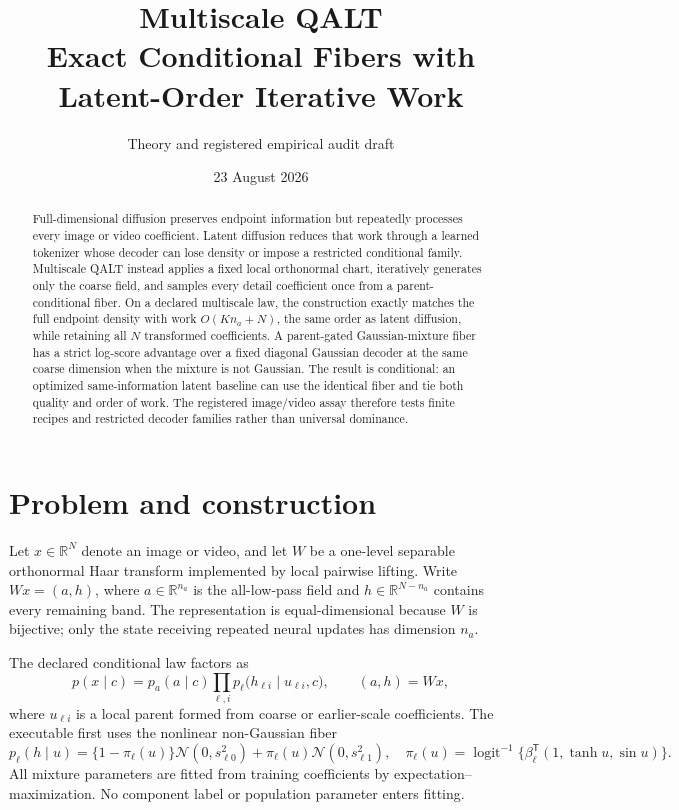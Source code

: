 \documentclass[11pt]{article}
\title{Multiscale QALT\\\large Exact Conditional Fibers with Latent-Order Iterative Work}
\author{Theory and registered empirical audit draft}
\date{23 August 2026}
\newcommand{\R}{\mathbb R}
\newcommand{\cN}{\mathcal N}
\begin{document}
\maketitle

\begin{abstract}
Full-dimensional diffusion preserves endpoint information but repeatedly processes every image or video coefficient.  Latent diffusion reduces that work through a learned tokenizer whose decoder can lose density or impose a restricted conditional family.  Multiscale QALT instead applies a fixed local orthonormal chart, iteratively generates only the coarse field, and samples every detail coefficient once from a parent-conditional fiber.  On a declared multiscale law, the construction exactly matches the full endpoint density with work $O(Kn_a+N)$, the same order as latent diffusion, while retaining all $N$ transformed coefficients.  A parent-gated Gaussian-mixture fiber has a strict log-score advantage over a fixed diagonal Gaussian decoder at the same coarse dimension when the mixture is not Gaussian.  The result is conditional: an optimized same-information latent baseline can use the identical fiber and tie both quality and order of work.  The registered image/video assay therefore tests finite recipes and restricted decoder families rather than universal dominance.
\end{abstract}

\section{Problem and construction}

Let $x\in\R^N$ denote an image or video, and let $W$ be a one-level separable orthonormal Haar transform implemented by local pairwise lifting.  Write $Wx=(a,h)$, where $a\in\R^{n_a}$ is the all-low-pass field and $h\in\R^{N-n_a}$ contains every remaining band.  The representation is equal-dimensional because $W$ is bijective; only the state receiving repeated neural updates has dimension $n_a$.

The declared conditional law factors as
\begin{equation}
p(x\mid c)=p_a(a\mid c)\prod_{\ell,i}p_{\ell}\bigl(h_{\ell i}\mid u_{\ell i},c\bigr),
\qquad (a,h)=Wx,
\label{eq:factorization}
\end{equation}
where $u_{\ell i}$ is a local parent formed from coarse or earlier-scale coefficients.  The executable first uses the nonlinear non-Gaussian fiber
\begin{equation}
p_{\ell}(h\mid u)
=\{1-\pi_{\ell}(u)\}\cN(0,s_{\ell0}^2)
+\pi_{\ell}(u)\cN(0,s_{\ell1}^2),
\quad
\pi_{\ell}(u)=\operatorname{logit}^{-1}\{\beta_{\ell}^{\mathsf T}(1,\tanh u,\sin u)\}.
\label{eq:mixture}
\end{equation}
All mixture parameters are fitted from training coefficients by expectation--maximization.  No component label or population parameter enters fitting.
\end{document}
